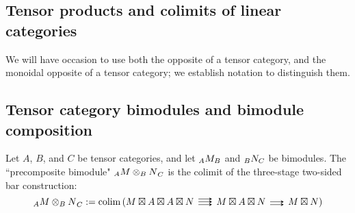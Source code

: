 \documentclass{amsart}
\begin{document}
\subsection{Tensor products and colimits of linear categories} \label{sec-tc-tensorprod}

\begin{definition}
\end{definition}

\begin{definition} \label{def-colim}
\end{definition}


We will have occasion to use both the opposite of a tensor category, and the monoidal opposite of a tensor category; we establish notation to distinguish them.  

\subsection{Tensor category bimodules and bimodule composition} \label{sec-tc-bimod}


\begin{definition}
\end{definition}

\begin{definition}
Let $A$, $B$, and $C$ be tensor categories, and let ${}_{A} {M}_{B}$ and ${}_{B} {N}_{C}$ be bimodules.  The ``precomposite bimodule" ${}_{A} {M \otimes_B N}_{C}$ is the colimit of the three-stage two-sided bar construction:
\begin{equation} \nn
\bimod{A}{M \otimes_B N}{C} := \colim \left( M \dtimes A \dtimes A \dtimes N \righttriplearrows M \dtimes A \dtimes N \rightdoublearrows M \dtimes N \right)
\end{equation}
\end{definition}
\end{document}
